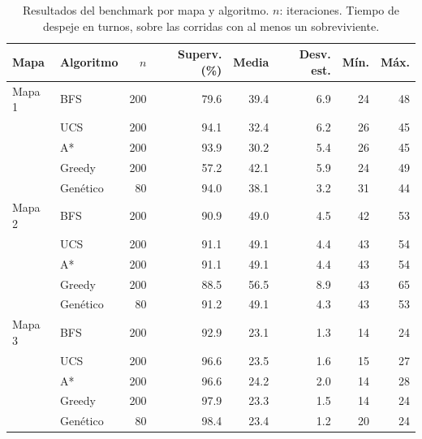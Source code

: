 \begin{table}[htbp]
\centering
\caption{Resultados del benchmark por mapa y algoritmo. $n$: iteraciones. Tiempo de despeje en turnos, sobre las corridas con al menos un sobreviviente.}
\label{tab:resultados}
\begin{tabular}{llrrrrrr}
\toprule
Mapa & Algoritmo & $n$ & Superv. (\%) & Media & Desv. est. & Mín. & Máx. \\
\midrule
Mapa 1 & BFS & 200 & 79.6 & 39.4 & 6.9 & 24 & 48 \\
 & UCS & 200 & 94.1 & 32.4 & 6.2 & 26 & 45 \\
 & A* & 200 & 93.9 & 30.2 & 5.4 & 26 & 45 \\
 & Greedy & 200 & 57.2 & 42.1 & 5.9 & 24 & 49 \\
 & Genético & 80 & 94.0 & 38.1 & 3.2 & 31 & 44 \\
\midrule
Mapa 2 & BFS & 200 & 90.9 & 49.0 & 4.5 & 42 & 53 \\
 & UCS & 200 & 91.1 & 49.1 & 4.4 & 43 & 54 \\
 & A* & 200 & 91.1 & 49.1 & 4.4 & 43 & 54 \\
 & Greedy & 200 & 88.5 & 56.5 & 8.9 & 43 & 65 \\
 & Genético & 80 & 91.2 & 49.1 & 4.3 & 43 & 53 \\
\midrule
Mapa 3 & BFS & 200 & 92.9 & 23.1 & 1.3 & 14 & 24 \\
 & UCS & 200 & 96.6 & 23.5 & 1.6 & 15 & 27 \\
 & A* & 200 & 96.6 & 24.2 & 2.0 & 14 & 28 \\
 & Greedy & 200 & 97.9 & 23.3 & 1.5 & 14 & 24 \\
 & Genético & 80 & 98.4 & 23.4 & 1.2 & 20 & 24 \\
\bottomrule
\end{tabular}
\end{table}
